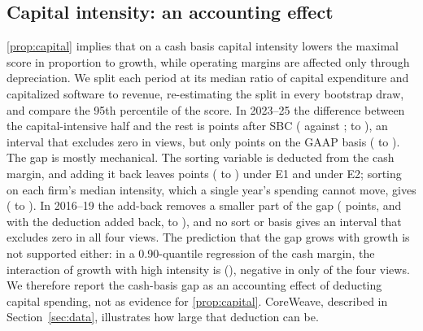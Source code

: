 \subsection{Capital intensity: an accounting effect}
\autoref{prop:capital} implies that on a cash basis capital intensity lowers the maximal score in proportion to growth, while operating margins are affected only through depreciation. We split each period at its median ratio of capital expenditure and capitalized software to revenue, re-estimating the split in every bootstrap draw, and compare the 95th percentile of the score. In 2023--25 the difference between the capital-intensive half and the rest is \CapCashEone{} points after SBC (\CapHiHalf{} against \CapLoHalf; \CapCashEoneLo{} to \CapCashEoneHi), an interval that excludes zero in \CapCashCount{} views, but only \CapOpEone{} points on the GAAP basis (\CapOpEoneLo{} to \CapOpEoneHi). The gap is mostly mechanical. The sorting variable is deducted from the cash margin, and adding it back leaves \CapAddEone{} points (\CapAddEoneLo{} to \CapAddEoneHi) under E1 and \CapAddEtwo{} under E2; sorting on each firm's median intensity, which a single year's spending cannot move, gives \CapFirmMedEone{} (\CapFirmMedEoneLo{} to \CapFirmMedEoneHi). In 2016--19 the add-back removes a smaller part of the gap (\CapCashEarlyEone{} points, and \CapAddEarlyEone{} with the deduction added back, \CapAddEarlyEoneLo{} to \CapAddEarlyEoneHi), and no sort or basis gives an interval that excludes zero in all four views. The prediction that the gap grows with growth is not supported either: in a 0.90-quantile regression of the cash margin, the interaction of growth with high intensity is \CapInter{} (\CapInterSe), negative in only \CapInterSign{} of the four views. We therefore report the cash-basis gap as an accounting effect of deducting capital spending, not as evidence for \autoref{prop:capital}. CoreWeave, described in Section~\ref{sec:data}, illustrates how large that deduction can be.

